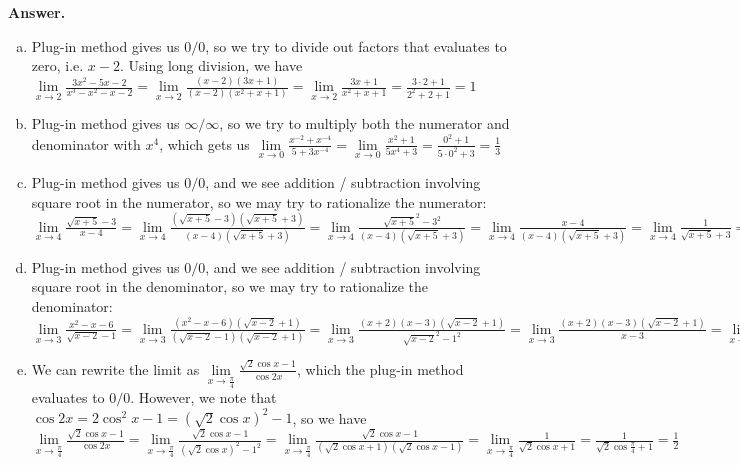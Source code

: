 \documentclass[11pt,letterpaper]{article}
\newcommand{\answer}{\noindent \textbf{Answer. }}
\begin{document}
\answer
\begin{enumerate}[(a)]
    \item Plug-in method gives us $0/0$, so we try to divide out factors that evaluates to zero, i.e. $x-2$.  Using long division, we have $\lim\limits_{x \to 2} \frac{3x^2-5x-2}{x^3-x^2-x-2} = \lim\limits_{x \to 2} \frac{(x-2)(3x+1)}{(x-2)(x^2+x+1)} = \lim\limits_{x \to 2} \frac{3x+1}{x^2+x+1} = \frac{3\cdot 2+1}{2^2+2+1} = 1$
    \item Plug-in method gives us $\infty/\infty$, so we try to multiply both the numerator and denominator with $x^4$, which gets us $\lim\limits_{x \to 0} \frac{x^{-2} + x^{-4}}{5 + 3x^{-4}} = \lim\limits_{x \to 0} \frac{x^2 + 1}{5x^4 + 3} = \frac{0^2+1}{5\cdot 0^2+3} = \frac{1}{3}$
    \item Plug-in method gives us $0/0$, and we see addition / subtraction involving square root in the numerator, so we may try to rationalize the numerator: $\lim\limits_{x \to 4} \frac{\sqrt{x+5}-3}{x-4} = \lim\limits_{x \to 4} \frac{(\sqrt{x+5}-3)(\sqrt{x+5}+3)}{(x-4)(\sqrt{x+5}+3)} = \lim\limits_{x \to 4} \frac{\sqrt{x+5}^2-3^2}{(x-4)(\sqrt{x+5}+3)} = \lim\limits_{x \to 4} \frac{x-4}{(x-4)(\sqrt{x+5}+3)} = \lim\limits_{x \to 4} \frac{1}{\sqrt{x+5}+3} = \frac{1}{\sqrt{4+5}+3} = \frac{1}{6}$
    \item Plug-in method gives us $0/0$, and we see addition / subtraction involving square root in the denominator, so we may try to rationalize the denominator: $\lim\limits_{x \to 3} \frac{x^2-x-6}{\sqrt{x-2}-1} = \lim\limits_{x \to 3} \frac{(x^2-x-6)(\sqrt{x-2}+1)}{(\sqrt{x-2}-1)(\sqrt{x-2}+1)} = \lim\limits_{x \to 3} \frac{(x+2)(x-3)(\sqrt{x-2}+1)}{\sqrt{x-2}^2-1^2} = \lim\limits_{x \to 3} \frac{(x+2)(x-3)(\sqrt{x-2}+1)}{x-3} = \lim\limits_{x \to 3} (x+2)(\sqrt{x-2}+1) = (3+2)(\sqrt{3-2}+1) = 10$
    \item We can rewrite the limit as $\lim\limits_{x \to \frac{\pi}{4}} \frac{\sqrt{2}\cos x - 1}{\cos 2x}$, which the plug-in method evaluates to $0/0$.  However, we note that $\cos 2x = 2\cos^2 x -1 = (\sqrt{2}\cos x)^2 - 1$, so we have $\lim\limits_{x \to \frac{\pi}{4}} \frac{\sqrt{2}\cos x - 1}{\cos 2x} = \lim\limits_{x \to \frac{\pi}{4}} \frac{\sqrt{2}\cos x - 1}{(\sqrt{2}\cos x)^2 - 1^2} = \lim\limits_{x \to \frac{\pi}{4}} \frac{\sqrt{2}\cos x - 1}{(\sqrt{2}\cos x + 1)(\sqrt{2}\cos x - 1)} = \lim\limits_{x \to \frac{\pi}{4}} \frac{1}{\sqrt{2}\cos x + 1} = \frac{1}{\sqrt{2}\cos\frac{\pi}{4} +1} = \frac{1}{2}$
\end{enumerate}\vspace{6mm}
\end{document}
